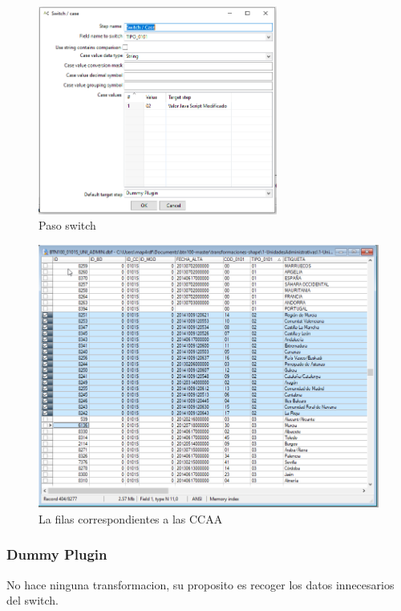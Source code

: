 \begin{figure}[H]
    \includegraphics[width=0.7\textwidth]{images/switch.png}
    \centering
    \caption{Paso switch}
    \label{fig:switch}
\end{figure}

\begin{figure}[H]
    \includegraphics[width=\textwidth]{images/tipo02.png}
    \centering
    \caption{La filas correspondientes a las CCAA}
    \label{fig:tipo02}
\end{figure}

\subsubsection{Dummy Plugin}
No hace ninguna transformacion, su proposito es recoger los datos innecesarios del switch.

